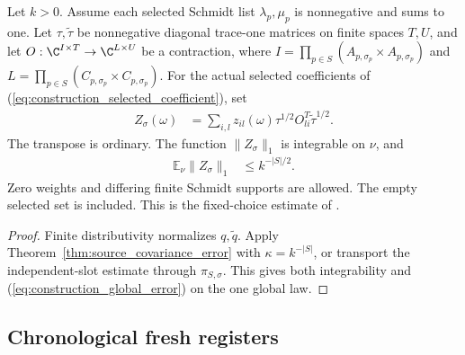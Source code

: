 \begin{theorem}
    \label{thm:construction_global_error}
    \leanok
    Let $k>0$. Assume each selected Schmidt list $\lambda_p,\mu_p$ is nonnegative
    and sums to one. Let $\tau,\widetilde\tau$ be nonnegative diagonal
    trace-one matrices on finite spaces $T,U$, and let
    $O:\C^{I\times T}\to\C^{L\times U}$ be a contraction, where
    $I=\prod_{p\in S}(A_{p,\sigma_p}\times A_{p,\sigma_p})$ and
    $L=\prod_{p\in S}(C_{p,\sigma_p}\times C_{p,\sigma_p})$.
    For the actual selected coefficients of
    (\ref{eq:construction_selected_coefficient}), set
    \begin{align}
        Z_\sigma(\omega) & =\sum_{i,l}z_{il}(\omega)
        \tau^{1/2}O_{li}^{T}\widetilde\tau^{1/2}.
        \label{eq:construction_selected_error}
    \end{align}
    The transpose is ordinary. The function
    $\lVert Z_\sigma\rVert_1$ is integrable on $\nu$, and
    \begin{align}
        \mathbb E_\nu\lVert Z_\sigma\rVert_1 & \leq k^{-|S|/2}.
        \label{eq:construction_global_error}
    \end{align}
    Zero weights and differing finite Schmidt supports are allowed.
    The empty selected set is included. This is the fixed-choice
    estimate of \cite[Equation~(5.18)]{OpenAI2026PolynomialPEPS}.
\end{theorem}

\begin{proof}\leanok
    Finite distributivity normalizes $q,\widetilde q$.
    Apply Theorem~\ref{thm:source_covariance_error} with
    $\kappa=k^{-|S|}$, or transport the independent-slot estimate
    through $\pi_{S,\sigma}$. This gives both integrability and
    (\ref{eq:construction_global_error}) on the one global law.
\end{proof}

\subsection{Chronological fresh registers}


